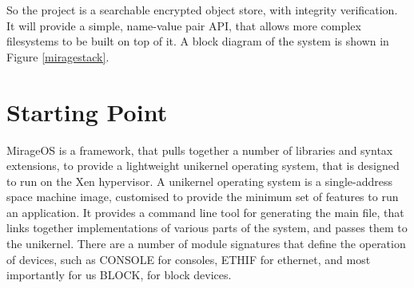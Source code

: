 \documentclass[12pt,a4paper,twoside]{article}
\begin{document}
So the project is a searchable encrypted object store, with integrity verification. It will provide a simple, name-value pair API, that allows more complex filesystems to be built on top of it. A block diagram of the system is shown in Figure \ref{miragestack}.

%
%
%
%
%
%
%
%
%
%

\setlength{\unitlength}{0.75mm}


\section*{Starting Point}


MirageOS is a framework, that pulls together a number of libraries and syntax extensions, to provide a lightweight unikernel operating system, that is designed to run on the Xen hypervisor. A unikernel operating system is a single-address space machine image, customised to provide the minimum set of features to run an application. It provides a command line tool for generating the main file, that links together implementations of various parts of the system, and passes them to the unikernel. There are a number of module signatures that define the operation of devices, such as CONSOLE for consoles, ETHIF for ethernet, and most importantly for us BLOCK, for block devices.
\end{document}
